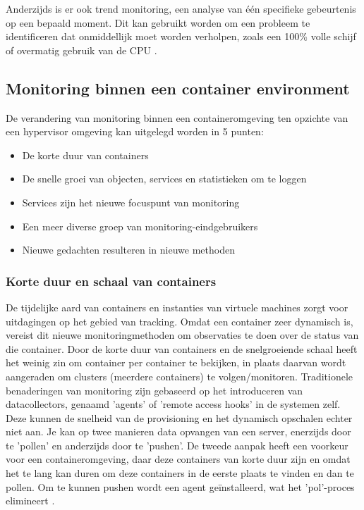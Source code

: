 Anderzijds is er ook trend monitoring, een analyse van één specifieke gebeurtenis op een bepaald moment. Dit kan gebruikt worden om een probleem te identificeren dat onmiddellijk moet worden verholpen, zoals een 100\% volle schijf of overmatig gebruik van de CPU \autocite{TechTarget2020}.

\subsection{Monitoring binnen een container environment}

De verandering van monitoring binnen een containeromgeving ten opzichte van een hypervisor omgeving kan uitgelegd worden in 5 punten:

\begin{itemize}
    \item De korte duur van containers
    \item De snelle groei van objecten, services en statistieken om te loggen
    \item Services zijn het nieuwe focuspunt van monitoring
    \item Een meer diverse groep van monitoring-eindgebruikers
    \item Nieuwe gedachten resulteren in nieuwe methoden
\end{itemize}

\subsubsection{Korte duur en schaal van containers}

De tijdelijke aard van containers en instanties van virtuele machines zorgt voor uitdagingen op het gebied van tracking. Omdat een container zeer dynamisch is, vereist dit nieuwe monitoringmethoden om observaties te doen over de status van die container. Door de korte duur van containers en de snelgroeiende schaal heeft het weinig zin om container per container te bekijken, in plaats daarvan wordt aangeraden om clusters (meerdere containers) te volgen/monitoren. Traditionele benaderingen van monitoring zijn gebaseerd op het introduceren van datacollectors, genaamd 'agents' of 'remote access hooks' in de systemen zelf. Deze kunnen de snelheid van de provisioning en het dynamisch opschalen echter niet aan. Je kan op twee manieren data opvangen van een server, enerzijds door te 'pollen' en anderzijds door te 'pushen'. De tweede aanpak heeft een voorkeur voor een containeromgeving, daar deze containers van korte duur zijn en omdat het te lang kan duren om deze containers in de eerste plaats te vinden en dan te pollen. Om te kunnen pushen wordt een agent geïnstalleerd, wat het 'pol'-proces elimineert \autocite{Williams2016}. 

